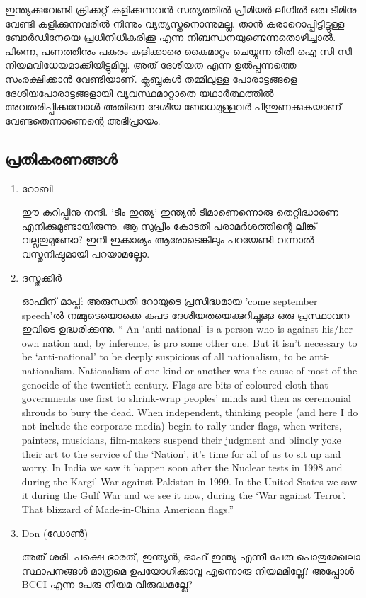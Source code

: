 ഇന്ത്യക്കുവേണ്ടി ക്രിക്കറ്റ് കളിക്കുന്നവന്‍ സത്യത്തില്‍ പ്രീമിയര്‍ ലീഗില്‍ ഒരു ടീമിനു വേണ്ടി കളിക്കുന്നവരില്‍ നിന്നും വ്യത്യസ്തനൊന്നുമല്ല. താന്‍ കരാറൊപ്പിട്ടിട്ടുള്ള ബോര്‍ഡിനേയെ പ്രധിനിധീകരിക്കൂ എന്ന നിബന്ധനയുണ്ടെന്നതൊഴിച്ചാല്‍. പിന്നെ, പണത്തിനും പകരം കളിക്കാരെ കൈമാറ്റം ചെയ്യുന്ന രീതി ഐ സി സി നിയമവിധേയമാക്കിയിട്ടുമില്ല. അത് ദേശീയത എന്ന ഉല്‍പ്പന്നത്തെ സംരക്ഷിക്കാന്‍ വേണ്ടിയാണ്. ക്ലബ്ബുകള്‍ തമ്മിലുള്ള പോരാട്ടങ്ങളെ ദേശീയപോരാട്ടങ്ങളായി വ്യവസ്ഥമാറ്റാതെ യഥാര്‍ത്ഥത്തില്‍ അവതരിപ്പിക്കുമ്പോള്‍ അതിനെ ദേശീയ ബോധമുള്ളവര്‍ പിന്തുണക്കുകയാണ് വേണ്ടതെന്നാണെന്റെ അഭിപ്രായം.

\subsection*{പ്രതികരണങ്ങള്‍}
\begin{enumerate}
 \item{റോബി}

ഈ കുറിപ്പിനു നന്ദി. 'ടീം ഇന്ത്യ' ഇന്ത്യന്‍ ടീമാണെന്നൊരു തെറ്റിദ്ധാരണ എനിക്കുമുണ്ടായിരുന്നു. ആ സുപ്രീം കോടതി പരാമര്‍ശത്തിന്റെ ലിങ്ക് വല്ലതുമുണ്ടോ? ഇനി ഇക്കാര്യം ആരോടെങ്കിലും പറയേണ്ടി വന്നാല്‍ വസ്തുനിഷ്ഠമായി പറയാമല്ലോ.

 \item{ദസ്തക്കിര്‍}

ഓഫിന് മാപ്പ്: അരുന്ധതി റോയുടെ പ്രസിദ്ധമായ 'come september speech'ല്‍ നമ്മുടെയൊക്കെ കപട ദേശീയതയെക്കുറിച്ചുള്ള ഒരു പ്രസ്ഥാവന ഇവിടെ ഉദ്ധരിക്കുന്നു. “ An ‘anti-national’ is a person who is against his/her own nation and, by inference, is pro some other one. But it isn’t necessary to be ‘anti-national’ to be deeply suspicious of all nationalism, to be anti-nationalism. Nationalism of one kind or another was the cause of most of the genocide of the twentieth century. Flags are bits of coloured cloth that governments use first to shrink-wrap peoples’ minds and then as ceremonial shrouds to bury the dead. When independent, thinking people (and here I do not include the corporate media) begin to rally under flags, when writers, painters, musicians, film-makers suspend their judgment and blindly yoke their art to the service of the ‘Nation’, it’s time for all of us to sit up and worry. In India we saw it happen soon after the Nuclear tests in 1998 and during the Kargil War against Pakistan in 1999. In the United States we saw it during the Gulf War and we see it now, during the ‘War against Terror’. That blizzard of Made-in-China American flags.”

 \item{Don (ഡോണ്‍)}

അത് ശരി. പക്ഷെ ഭാരത്, ഇന്ത്യന്‍, ഓഫ് ഇന്ത്യ എന്നീ പേരു പൊതുമേഖലാ സ്ഥാപനങ്ങള്‍ മാത്രമെ ഉപയോഗിക്കാവൂ എന്നൊരു നിയമമില്ലേ? അപ്പോള്‍ BCCI എന്ന പേരു നിയമ വിരുദ്ധമല്ലേ?


\end{enumerate}
